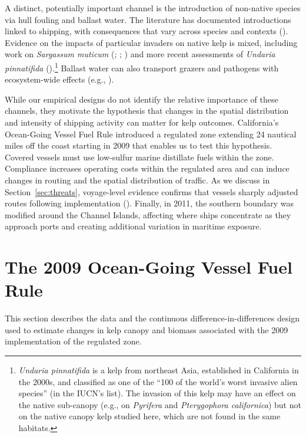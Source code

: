 \documentclass[12pt]{article}
\begin{document}
A distinct, potentially important channel is the introduction of non-native species via hull fouling and ballast water. The literature has documented introductions linked to shipping, with consequences that vary across species and contexts (\citealp{Williams2007}). Evidence on the impacts of particular invaders on native kelp is mixed, including work on \textit{Sargassum muticum} (\citealp{Ambrose1982}; \citealp{BrittonSimmons2004}; \citealp{Smith2015}) and more recent assessments of \textit{Undaria pinnatifida} (\citealp{McHaskell2024}).\footnote{\textit{Undaria pinnatifida} is a kelp from northeast Asia, established in California in the 2000s, and classified as one of the ``100 of the world's worst invasive alien species'' (in the IUCN's list). The invasion of this kelp may have an effect on the native sub-canopy (e.g., on \textit{Pyrifera} and \textit{Pterygophora californica}) but not on the native canopy kelp studied here, which are not found in the same habitats.} Ballast water can also transport grazers and pathogens with ecosystem-wide effects (e.g., \citealp{Phinney2001}). 

While our empirical designs do not identify the relative importance of these channels, they motivate the hypothesis that changes in the spatial distribution and intensity of shipping activity can matter for kelp outcomes. California's Ocean-Going Vessel Fuel Rule introduced a regulated zone extending 24 nautical miles off the coast starting in 2009 that enables us to test this hypothesis. Covered vessels must use low-sulfur marine distillate fuels within the zone. Compliance increases operating costs within the regulated area and can induce changes in routing and the spatial distribution of traffic. As we discuss in Section~\ref{sec:threats}, voyage-level evidence confirms that vessels sharply adjusted routes following implementation (\citealp{Klotz2022}). Finally, in 2011, the southern boundary was modified around the Channel Islands, affecting where ships concentrate as they approach ports and creating additional variation in maritime exposure.

\section{The 2009 Ocean-Going Vessel Fuel Rule}
\label{sec:empirical}

This section describes the data and the continuous difference-in-differences design used to estimate changes in kelp canopy and biomass associated with the 2009 implementation of the regulated zone.
\end{document}
